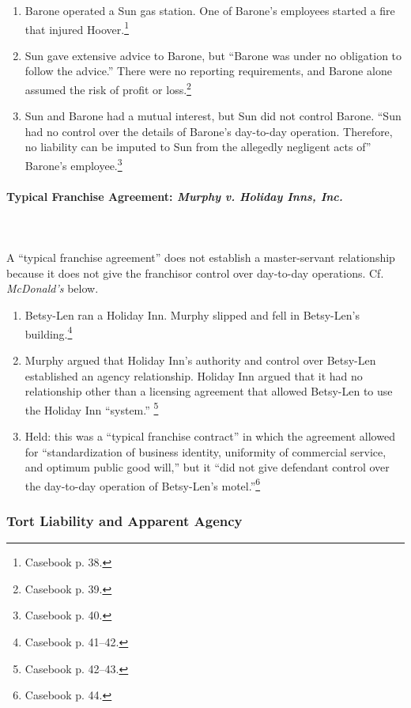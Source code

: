 \begin{enumerate}
    \item Barone operated a Sun gas station. One of Barone's employees started 
    a fire that injured Hoover.\footnote{Casebook p. 38.}
    \item Sun gave extensive advice to Barone, but ``Barone was under no 
    obligation to follow the advice.'' There were no reporting requirements, 
    and Barone alone assumed the risk of profit or loss.\footnote{Casebook p. 
    39.}
    \item Sun and Barone had a mutual interest, but Sun did not control 
    Barone. ``Sun had no control over the details of Barone's day-to-day 
    operation. Therefore, no liability can be imputed to Sun from the 
    allegedly negligent acts of'' Barone's employee.\footnote{Casebook p. 40.}
\end{enumerate}

\paragraph{Typical Franchise Agreement: \emph{Murphy v. Holiday Inns, Inc.}}
~\\\\
A ``typical franchise agreement'' does not establish a master-servant 
relationship because it does not give the franchisor control over day-to-day 
operations. Cf. \emph{McDonald's} below.

\begin{enumerate}
    \item Betsy-Len ran a Holiday Inn. Murphy slipped and fell in Betsy-Len's 
    building.\footnote{Casebook p. 41--42.}
    \item Murphy argued that Holiday Inn's authority and control over 
    Betsy-Len established an agency relationship. Holiday Inn argued that it 
    had no relationship other than a licensing agreement that allowed 
    Betsy-Len to use the Holiday Inn ``system.''
    \footnote{Casebook p. 42--43.}
    \item Held: this was a ``typical franchise contract'' in which the 
    agreement allowed for ``standardization of business identity, uniformity 
    of commercial service, and optimum public good will,'' but it ``did not 
    give defendant control over the day-to-day operation of Betsy-Len's 
    motel.''\footnote{Casebook p. 44.}
\end{enumerate}

\subsubsection{Tort Liability and Apparent Agency}

